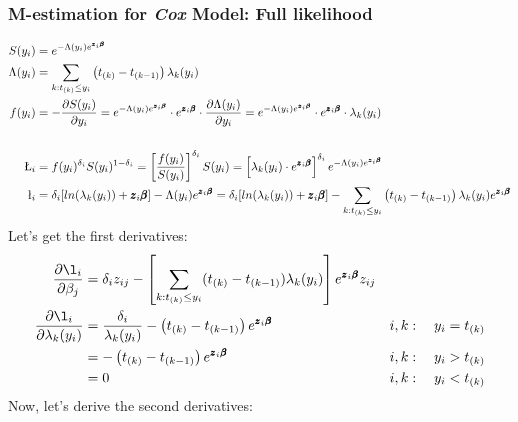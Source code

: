 \documentclass[]{article}
\begin{document}
\subsubsection{M-estimation for \emph{Cox} Model: Full likelihood}
$$
  \begin{aligned}
    S(y_i) &=  e^{-\Lambda(y_i) e^{\pmb{z}_i\pmb{\beta}}} \\
    \Lambda(y_i)  &= \sum_{k: t_{(k)}\leq y_i} \left(t_{(k)} - t_{(k-1)}\right) \lambda_k(y_i)\\
    f(y_i) &= -\frac{\partial S(y_i)}{\partial y_i} =   e^{-\Lambda(y_i) e^{\pmb{z}_i\pmb{\beta}}} \cdot e^{\pmb{z}_i\pmb{\beta}} \cdot \frac{\partial \Lambda(y_i)}{\partial y_i} =   e^{-\Lambda(y_i) e^{\pmb{z}_i\pmb{\beta}}} \cdot e^{\pmb{z}_i\pmb{\beta}} \cdot \lambda_k(y_i) \\\\
    \L_i  &= f(y_i)^{\delta_i} S(y_i)^{1 - \delta_i} = \left[  \frac{f(y_i)}{S(y_i)}  \right]^{\delta_i}   S(y_i) = \left[   \lambda_k(y_i) \cdot e^{\pmb{z}_i\pmb{\beta}}   \right]^{\delta_i} e^{-\Lambda(y_i) e^{\pmb{z}_i\pmb{\beta}}}\\
    \l_i  &= \delta_i [ln(\lambda_k(y_i)) + \pmb{z}_i\pmb{\beta}] -\Lambda(y_i) e^{\pmb{z}_i\pmb{\beta}} = \delta_i [ln(\lambda_k(y_i)) + \pmb{z}_i\pmb{\beta}] -\sum_{k: t_{(k)}\leq y_i} \left(t_{(k)} - t_{(k-1)}\right) \lambda_k(y_i) e^{\pmb{z}_i\pmb{\beta}}\\
  \end{aligned}
  $$
Let's get the first derivatives:
$$
  \begin{aligned}
   \frac{\partial \l_i}{\partial \beta_j}  &= \delta_iz_{ij}  - \left[  \sum_{k: t_{(k)}\leq y_i} (t_{(k)} - t_{(k-1)}) \lambda_k(y_i)   \right]  e^{\pmb{z}_i\pmb{\beta}} z_{ij}\\
    \frac{\partial \l_i}{\partial \lambda_k(y_i)}  &= \frac{\delta_i}{\lambda_k(y_i)} -  \left(  t_{(k)} - t_{(k-1)}  \right) e^{\pmb{z}_i\pmb{\beta}}~~~~  &i,k:~~~ y_i = t_{(k)} \\
      &= -  \left(  t_{(k)} - t_{(k-1)}  \right) e^{\pmb{z}_i\pmb{\beta}}~~~~  &i,k:~~~y_i > t_{(k)}\\
      &= 0 ~~~~  &i,k:~~~y_i < t_{(k)}\\
  \end{aligned}
$$
Now, let's derive the second derivatives:
\end{document}
